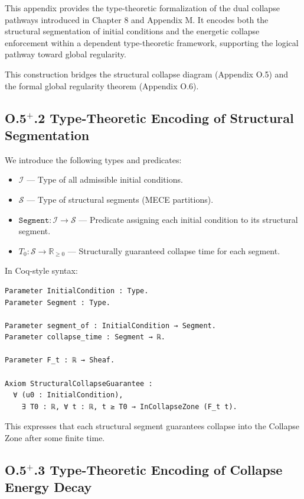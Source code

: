 \documentclass[11pt]{article}
\begin{document}
This appendix provides the type-theoretic formalization of the dual collapse pathways introduced in Chapter 8 and Appendix M.  
It encodes both the structural segmentation of initial conditions and the energetic collapse enforcement within a dependent type-theoretic framework, supporting the logical pathway toward global regularity.

This construction bridges the structural collapse diagram (Appendix O.5) and the formal global regularity theorem (Appendix O.6).

\subsection*{O.5$^+$.2 Type-Theoretic Encoding of Structural Segmentation}

We introduce the following types and predicates:

\begin{itemize}
  \item \( \mathcal{I} \) — Type of all admissible initial conditions.
  \item \( \mathcal{S} \) — Type of structural segments (MECE partitions).
  \item \( \texttt{Segment} : \mathcal{I} \to \mathcal{S} \) — Predicate assigning each initial condition to its structural segment.
  \item \( T_0 : \mathcal{S} \to \mathbb{R}_{\geq 0} \) — Structurally guaranteed collapse time for each segment.
\end{itemize}

In Coq-style syntax:

\begin{lstlisting}[language=Coq]
Parameter InitialCondition : Type.
Parameter Segment : Type.

Parameter segment_of : InitialCondition → Segment.
Parameter collapse_time : Segment → ℝ.

Parameter F_t : ℝ → Sheaf.

Axiom StructuralCollapseGuarantee :
  ∀ (u0 : InitialCondition),
    ∃ T0 : ℝ, ∀ t : ℝ, t ≥ T0 → InCollapseZone (F_t t).
\end{lstlisting}

This expresses that each structural segment guarantees collapse into the Collapse Zone after some finite time.

\subsection*{O.5$^+$.3 Type-Theoretic Encoding of Collapse Energy Decay}
\end{document}

